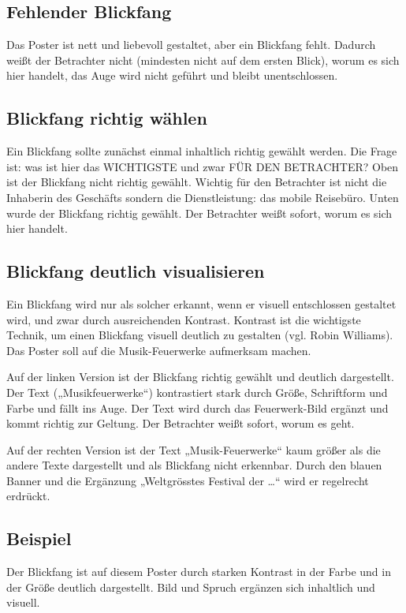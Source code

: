 \subsection{Fehlender Blickfang}
Das Poster ist nett und liebevoll gestaltet, aber ein Blickfang fehlt. Dadurch weißt der Betrachter nicht (mindesten nicht auf dem ersten Blick), worum es sich hier handelt, das Auge wird nicht geführt und bleibt unentschlossen.
\subsection{Blickfang richtig wählen}
Ein Blickfang sollte zunächst einmal inhaltlich richtig gewählt werden. Die Frage ist: was ist hier das WICHTIGSTE und zwar FÜR DEN BETRACHTER?
Oben ist der Blickfang nicht richtig gewählt. Wichtig für den Betrachter ist nicht die Inhaberin des Geschäfts sondern die Dienstleistung: das mobile Reisebüro. Unten wurde der Blickfang richtig gewählt. Der Betrachter weißt sofort, worum es sich hier handelt.
\subsection{Blickfang deutlich visualisieren}
Ein Blickfang wird nur als solcher erkannt, wenn er visuell entschlossen gestaltet wird, und zwar durch ausreichenden Kontrast. Kontrast ist die wichtigste Technik, um einen Blickfang visuell deutlich zu gestalten (vgl. Robin Williams).
Das Poster soll auf die Musik-Feuerwerke aufmerksam machen.

Auf der linken Version ist der Blickfang richtig gewählt und deutlich dargestellt. Der Text („Musikfeuerwerke“) kontrastiert stark durch Größe, Schriftform und Farbe und fällt ins Auge. Der Text wird durch das Feuerwerk-Bild ergänzt und kommt richtig zur Geltung. Der Betrachter weißt sofort, worum es geht.

Auf der rechten Version ist der Text „Musik-Feuerwerke“ kaum größer als die andere Texte dargestellt und als Blickfang nicht erkennbar. Durch den blauen Banner und die Ergänzung „Weltgrösstes Festival der …“ wird er regelrecht erdrückt. 

\subsection{Beispiel}
Der Blickfang ist auf diesem Poster durch starken Kontrast in der Farbe und in der Größe deutlich dargestellt.  Bild und Spruch ergänzen sich inhaltlich und visuell. 